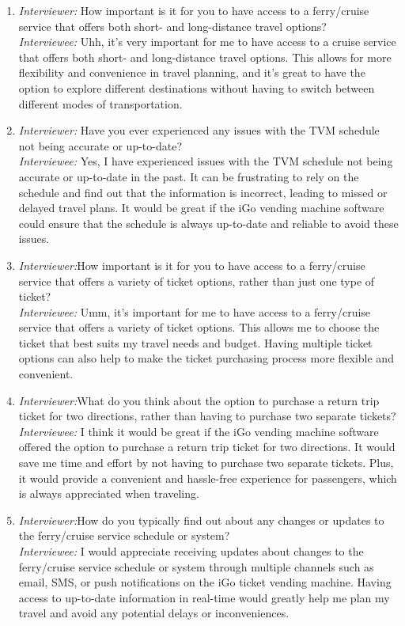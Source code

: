 \begin{enumerate}
\item \emph{Interviewer:} How important is it for you to have access to a ferry/cruise service that offers both short- and long-distance travel options?\\
\emph{Interviewee:}  Uhh, it's very important for me to have access to a cruise service that offers both short- and long-distance travel options. This allows for more flexibility and convenience in travel planning, and it's great to have the option to explore different destinations without having to switch between different modes of transportation.
\item \emph{Interviewer:} Have you ever experienced any issues with the TVM schedule not being accurate or up-to-date?\\
\emph{Interviewee:}  Yes, I have experienced issues with the TVM schedule not being accurate or up-to-date in the past. It can be frustrating to rely on the schedule and find out that the information is incorrect, leading to missed or delayed travel plans. It would be great if the iGo vending machine software could ensure that the schedule is always up-to-date and reliable to avoid these issues.
\item \emph{Interviewer:}How important is it for you to have access to a ferry/cruise service that offers a variety of ticket options, rather than just one type of ticket?\\
\emph{Interviewee:} Umm, it's important for me to have access to a ferry/cruise service that offers a variety of ticket options. This allows me to choose the ticket that best suits my travel needs and budget. Having multiple ticket options can also help to make the ticket purchasing process more flexible and convenient.
\item \emph{Interviewer:}What do 
you think about the option to purchase a return trip ticket for two directions, rather than having to purchase two separate tickets?\\
\emph{Interviewee:}  I think it would be great if the iGo vending machine software offered the option to purchase a return trip ticket for two directions. It would save me time and effort by not having to purchase two separate tickets. Plus, it would provide a convenient and hassle-free experience for passengers, which is always appreciated when traveling.
\item \emph{Interviewer:}How do you typically find out about any changes or updates to the ferry/cruise service schedule or system?\\
\emph{Interviewee:}   I would appreciate receiving updates about changes to the ferry/cruise service schedule or system through multiple channels such as email, SMS, or push notifications on the iGo ticket vending machine. Having access to up-to-date information in real-time would greatly help me plan my travel and avoid any potential delays or inconveniences.

\end{enumerate}
